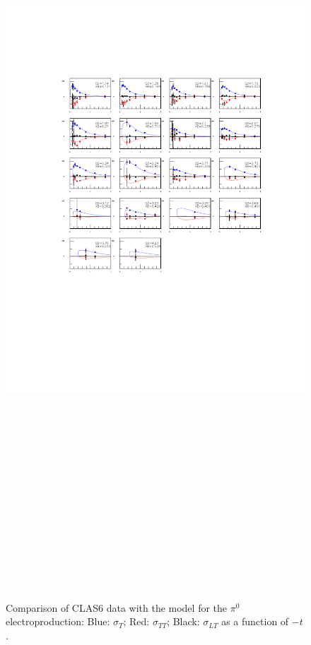 \documentclass[prc,floatfix,superscriptaddress]{revtex4}
\begin{document}
\begin{figure}[t!]
\vspace*{-10 mm}
\centerline{
\includegraphics[height=30cm]{../Test_plots/pi0_sf.pdf}
\label{pi0_sf}
}
\vspace*{-70mm}
\caption{Comparison of CLAS6 data with the model for the $\pi^0$ electroproduction:
Blue: $\sigma_T$;
Red: $\sigma_{TT}$;
Black: $\sigma_{LT}$ as a function of $-t$.
}
\label{fig:pi0_sf}
\end{figure}
\end{document}

